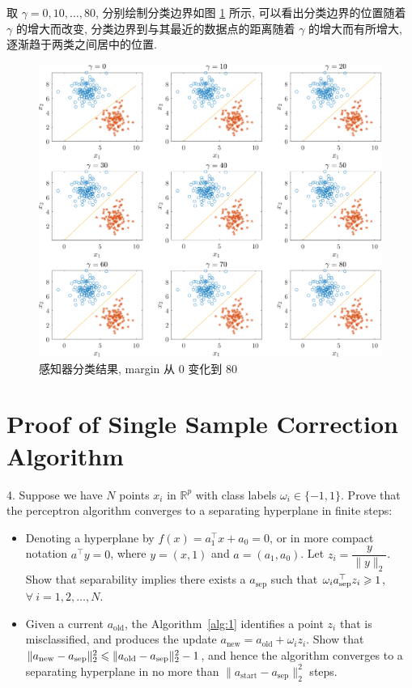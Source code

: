 \documentclass{article}
\begin{document}
取 $\gamma=0,10,\dots,80$, 分别绘制分类边界如图 \ref{fig:marginEffect2} 所示, 可以看出分类边界的位置随着 $\gamma$ 的增大而改变, 分类边界到与其最近的数据点的距离随着 $\gamma$ 的增大而有所增大, 逐渐趋于两类之间居中的位置.

\begin{figure}[htbp]
  \centering
  \includegraphics[width=17cm]{marginEffect2.pdf}
  \caption{感知器分类结果, margin 从 0 变化到 80}
  \label{fig:marginEffect2}
\end{figure}

\newpage
\section*{Proof of Single Sample Correction Algorithm}

4. Suppose we have $N$ points $x_i$ in $\mathbb{R}^p$ with class labels $\omega_i\in\{-1,1\}$. Prove that the perceptron algorithm converges to a separating hyperplane in finite steps:
\begin{itemize}
  \item Denoting a hyperplane by $f(x)=a_1^{\top}x+a_0=0$, or in more compact notation $a^{\top}y= 0$, where $y=(x,1)$ and $a=(a_1,a_0)$. Let $z_i=\dfrac{y}{\|y\|_2}$. Show that separability implies there exists a $a_{\mathrm{sep}}$ such that $\omega_ia_{\mathrm{sep}}^{\top}z_i\geqslant1$, $\forall~i=1,2,\dots,N$.
  \item Given a current $a_{\mathrm{old}}$, the Algorithm~\ref{alg:1} identifies a point $z_i$ that is misclassified, and produces the update $a_{\mathrm{new}} = a_{\mathrm{old}}+\omega_iz_i$. Show that $\|a_{\mathrm{new}}-a_{\mathrm{sep}}\|_2^2\leqslant\|a_{\mathrm{old}}-a_{\mathrm{sep}}\|_2^2-1$, and hence the algorithm converges to a separating hyperplane in no more than $\|a_{\mathrm{start}}-a_{\mathrm{sep}}\|_2^2$ steps. 
\end{itemize}
\end{document}
